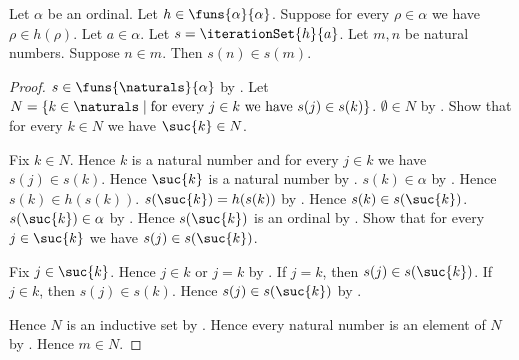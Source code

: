 \begin{proposition}\label{strict_ordinal_iteration_increasing}
    Let $\alpha$ be an ordinal.
    Let $h\in\funs{\alpha}{\alpha}$.
    Suppose for every $\rho\in\alpha$ we have $\rho\in h(\rho)$.
    Let $a\in\alpha$.
    Let $s=\iterationSet{h}{a}$.
    Let $m,n$ be natural numbers.
    Suppose $n\in m$.
    Then $s(n)\in s(m)$.
\end{proposition}
\begin{proof}
    $s\in\funs{\naturals}{\alpha}$
        by .
    Let $N=\{k\in\naturals\mid
        \text{for every $j\in k$ we have $s(j)\in s(k)$}\}$.
    $\emptyset\in N$ by .
    Show that for every $k\in N$ we have $\suc{k}\in N$.
    \begin{subproof}
        Fix $k\in N$.
        Hence $k$ is a natural number and
            for every $j\in k$ we have $s(j)\in s(k)$.
        Hence $\suc{k}$ is a natural number by .
        $s(k)\in\alpha$ by .
        Hence $s(k)\in h(s(k))$.
        $s(\suc{k})=h(s(k))$
            by .
        Hence $s(k)\in s(\suc{k})$.
        $s(\suc{k})\in\alpha$ by .
        Hence $s(\suc{k})$ is an ordinal
            by .
        Show that for every $j\in\suc{k}$ we have
            $s(j)\in s(\suc{k})$.
        \begin{subproof}
            Fix $j\in\suc{k}$.
            Hence $j\in k$ or $j=k$ by .
            If $j=k$, then $s(j)\in s(\suc{k})$.
            If $j\in k$, then $s(j)\in s(k)$.
            Hence $s(j)\in s(\suc{k})$
                by .
        \end{subproof}
    \end{subproof}
    Hence $N$ is an inductive set by .
    Hence every natural number is an element of $N$
        by .
    Hence $m\in N$.
\end{proof}


